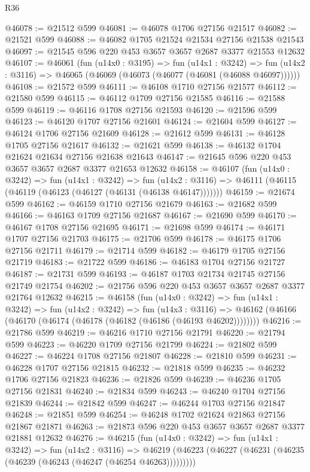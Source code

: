 \begin{lexlean}{R36}
\begin{coremodule}
@46078 := @21512 @599
@46081 := @46078 @1706 @27156 @21517
@46082 := @21521 @599
@46088 := @46082 @1705 @21524 @21534 @27156 @21538 @21543
@46097 := @21545 @596 @220 @453 @3657 @3657 @2687 @3377 @21553 @12632
@46107 := @46061
    (fun (u14x0 : @3195) =>
    fun (u14x1 : @3242) =>
    fun (u14x2 : @3116) => @46065 (@46069 (@46073 (@46077 (@46081 (@46088 @46097))))))
@46108 := @21572 @599
@46111 := @46108 @1710 @27156 @21577
@46112 := @21580 @599
@46115 := @46112 @1709 @27156 @21585
@46116 := @21588 @599
@46119 := @46116 @1708 @27156 @21593
@46120 := @21596 @599
@46123 := @46120 @1707 @27156 @21601
@46124 := @21604 @599
@46127 := @46124 @1706 @27156 @21609
@46128 := @21612 @599
@46131 := @46128 @1705 @27156 @21617
@46132 := @21621 @599
@46138 := @46132 @1704 @21624 @21634 @27156 @21638 @21643
@46147 := @21645 @596 @220 @453 @3657 @3657 @2687 @3377 @21653 @12632
@46158 := @46107
    (fun (u14x0 : @3242) =>
    fun (u14x1 : @3242) =>
    fun (u14x2 : @3116) => @46111 (@46115 (@46119 (@46123 (@46127 (@46131 (@46138 @46147)))))))
@46159 := @21674 @599
@46162 := @46159 @1710 @27156 @21679
@46163 := @21682 @599
@46166 := @46163 @1709 @27156 @21687
@46167 := @21690 @599
@46170 := @46167 @1708 @27156 @21695
@46171 := @21698 @599
@46174 := @46171 @1707 @27156 @21703
@46175 := @21706 @599
@46178 := @46175 @1706 @27156 @21711
@46179 := @21714 @599
@46182 := @46179 @1705 @27156 @21719
@46183 := @21722 @599
@46186 := @46183 @1704 @27156 @21727
@46187 := @21731 @599
@46193 := @46187 @1703 @21734 @21745 @27156 @21749 @21754
@46202 := @21756 @596 @220 @453 @3657 @3657 @2687 @3377 @21764 @12632
@46215 := @46158
    (fun (u14x0 : @3242) =>
    fun (u14x1 : @3242) =>
    fun (u14x2 : @3242) =>
    fun (u14x3 : @3116) =>
    @46162 (@46166 (@46170 (@46174 (@46178 (@46182 (@46186 (@46193 @46202))))))))
@46216 := @21786 @599
@46219 := @46216 @1710 @27156 @21791
@46220 := @21794 @599
@46223 := @46220 @1709 @27156 @21799
@46224 := @21802 @599
@46227 := @46224 @1708 @27156 @21807
@46228 := @21810 @599
@46231 := @46228 @1707 @27156 @21815
@46232 := @21818 @599
@46235 := @46232 @1706 @27156 @21823
@46236 := @21826 @599
@46239 := @46236 @1705 @27156 @21831
@46240 := @21834 @599
@46243 := @46240 @1704 @27156 @21839
@46244 := @21842 @599
@46247 := @46244 @1703 @27156 @21847
@46248 := @21851 @599
@46254 := @46248 @1702 @21624 @21863 @27156 @21867 @21871
@46263 := @21873 @596 @220 @453 @3657 @3657 @2687 @3377 @21881 @12632
@46276 := @46215
    (fun (u14x0 : @3242) =>
    fun (u14x1 : @3242) =>
    fun (u14x2 : @3116) =>
    @46219 (@46223 (@46227 (@46231 (@46235 (@46239 (@46243 (@46247 (@46254 @46263)))))))))

\end{coremodule}
\end{lexlean}
